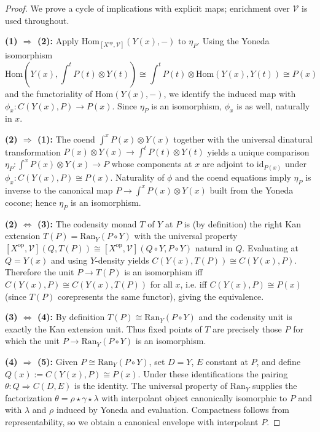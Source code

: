 \documentclass[11pt]{article}
\theoremstyle{plain}
\theoremstyle{definition}
\theoremstyle{remark}
\newcommand{\V}{\mathcal{V}}
\newcommand{\op}{\mathrm{op}}
\newcommand{\id}{\mathrm{id}}
\newcommand{\Hom}{\mathrm{Hom}}
\newcommand{\Ran}{\mathrm{Ran}}
\begin{document}
\begin{proof}
We prove a cycle of implications with explicit maps; enrichment over $\V$ is used throughout.

\textbf{(1) $\Rightarrow$ (2):} Apply $\Hom_{[X^{\op}, \V]}(Y(x), -)$ to $\eta_P$. Using the Yoneda isomorphism 
$$
\Hom(Y(x), \int^t P(t) \otimes Y(t)) \cong \int^t P(t) \otimes \Hom(Y(x), Y(t)) \cong P(x)
$$
and the functoriality of $\Hom(Y(x), -)$, we identify the induced map with $\phi_x : C(Y(x), P) \to P(x)$. Since $\eta_P$ is an isomorphism, $\phi_x$ is as well, naturally in $x$.

\textbf{(2) $\Rightarrow$ (1):} The coend $\int^x P(x) \otimes Y(x)$ together with the universal dinatural transformation $P(x) \otimes Y(x) \to \int^t P(t) \otimes Y(t)$ yields a unique comparison $\eta_P : \int^x P(x) \otimes Y(x) \to P$ whose components at $x$ are adjoint to $\id_{P(x)}$ under $\phi_x : C(Y(x), P) \cong P(x)$. Naturality of $\phi$ and the coend equations imply $\eta_P$ is inverse to the canonical map $P \to \int^x P(x) \otimes Y(x)$ built from the Yoneda cocone; hence $\eta_P$ is an isomorphism.

\textbf{(2) $\Leftrightarrow$ (3):} The codensity monad $T$ of $Y$ at $P$ is (by definition) the right Kan extension $T(P) = \Ran_Y(P \circ Y)$ with the universal property $[X^{\op}, \V](Q, T(P)) \cong [X^{\op}, \V](Q \circ Y, P \circ Y)$ natural in $Q$. Evaluating at $Q = Y(x)$ and using $Y$-density yields $C(Y(x), T(P)) \cong C(Y(x), P)$. Therefore the unit $P \to T(P)$ is an isomorphism iff $C(Y(x), P) \cong C(Y(x), T(P))$ for all $x$, i.e. iff $C(Y(x), P) \cong P(x)$ (since $T(P)$ corepresents the same functor), giving the equivalence.

\textbf{(3) $\Leftrightarrow$ (4):} By definition $T(P) \cong \Ran_Y(P \circ Y)$ and the codensity unit is exactly the Kan extension unit. Thus fixed points of $T$ are precisely those $P$ for which the unit $P \to \Ran_Y(P \circ Y)$ is an isomorphism.

\textbf{(4) $\Rightarrow$ (5):} Given $P \cong \Ran_Y(P \circ Y)$, set $D = Y$, $E$ constant at $P$, and define $Q(x) := C(Y(x), P) \cong P(x)$. Under these identifications the pairing $\theta : Q \Rightarrow C(D, E)$ is the identity. The universal property of $\Ran_Y$ supplies the factorization $\theta = \rho \star \gamma \star \lambda$ with interpolant object canonically isomorphic to $P$ and with $\lambda$ and $\rho$ induced by Yoneda and evaluation. Compactness follows from representability, so we obtain a canonical envelope with interpolant $P$.


\end{proof}
\end{document}
